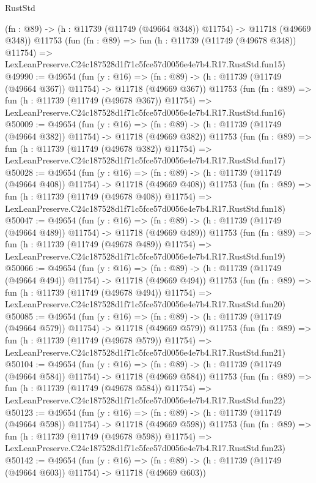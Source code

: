 \begin{lexlean}{RustStd}
\begin{coremodule}
    (fn : @89) -> (h : @11739 (@11749 (@49664 @348)) @11754) -> @11718 (@49669 @348))
    @11753
    (fun (fn : @89) =>
    fun (h : @11739 (@11749 (@49678 @348)) @11754) =>
    LexLeanPreserve.C24c187528d1f71c5fce57d0056e4e7b4.R17.RustStd.fun15)
@49990 := @49654
    (fun (y : @16) =>
    (fn : @89) -> (h : @11739 (@11749 (@49664 @367)) @11754) -> @11718 (@49669 @367))
    @11753
    (fun (fn : @89) =>
    fun (h : @11739 (@11749 (@49678 @367)) @11754) =>
    LexLeanPreserve.C24c187528d1f71c5fce57d0056e4e7b4.R17.RustStd.fun16)
@50009 := @49654
    (fun (y : @16) =>
    (fn : @89) -> (h : @11739 (@11749 (@49664 @382)) @11754) -> @11718 (@49669 @382))
    @11753
    (fun (fn : @89) =>
    fun (h : @11739 (@11749 (@49678 @382)) @11754) =>
    LexLeanPreserve.C24c187528d1f71c5fce57d0056e4e7b4.R17.RustStd.fun17)
@50028 := @49654
    (fun (y : @16) =>
    (fn : @89) -> (h : @11739 (@11749 (@49664 @408)) @11754) -> @11718 (@49669 @408))
    @11753
    (fun (fn : @89) =>
    fun (h : @11739 (@11749 (@49678 @408)) @11754) =>
    LexLeanPreserve.C24c187528d1f71c5fce57d0056e4e7b4.R17.RustStd.fun18)
@50047 := @49654
    (fun (y : @16) =>
    (fn : @89) -> (h : @11739 (@11749 (@49664 @489)) @11754) -> @11718 (@49669 @489))
    @11753
    (fun (fn : @89) =>
    fun (h : @11739 (@11749 (@49678 @489)) @11754) =>
    LexLeanPreserve.C24c187528d1f71c5fce57d0056e4e7b4.R17.RustStd.fun19)
@50066 := @49654
    (fun (y : @16) =>
    (fn : @89) -> (h : @11739 (@11749 (@49664 @494)) @11754) -> @11718 (@49669 @494))
    @11753
    (fun (fn : @89) =>
    fun (h : @11739 (@11749 (@49678 @494)) @11754) =>
    LexLeanPreserve.C24c187528d1f71c5fce57d0056e4e7b4.R17.RustStd.fun20)
@50085 := @49654
    (fun (y : @16) =>
    (fn : @89) -> (h : @11739 (@11749 (@49664 @579)) @11754) -> @11718 (@49669 @579))
    @11753
    (fun (fn : @89) =>
    fun (h : @11739 (@11749 (@49678 @579)) @11754) =>
    LexLeanPreserve.C24c187528d1f71c5fce57d0056e4e7b4.R17.RustStd.fun21)
@50104 := @49654
    (fun (y : @16) =>
    (fn : @89) -> (h : @11739 (@11749 (@49664 @584)) @11754) -> @11718 (@49669 @584))
    @11753
    (fun (fn : @89) =>
    fun (h : @11739 (@11749 (@49678 @584)) @11754) =>
    LexLeanPreserve.C24c187528d1f71c5fce57d0056e4e7b4.R17.RustStd.fun22)
@50123 := @49654
    (fun (y : @16) =>
    (fn : @89) -> (h : @11739 (@11749 (@49664 @598)) @11754) -> @11718 (@49669 @598))
    @11753
    (fun (fn : @89) =>
    fun (h : @11739 (@11749 (@49678 @598)) @11754) =>
    LexLeanPreserve.C24c187528d1f71c5fce57d0056e4e7b4.R17.RustStd.fun23)
@50142 := @49654
    (fun (y : @16) =>
    (fn : @89) -> (h : @11739 (@11749 (@49664 @603)) @11754) -> @11718 (@49669 @603))

\end{coremodule}
\end{lexlean}
